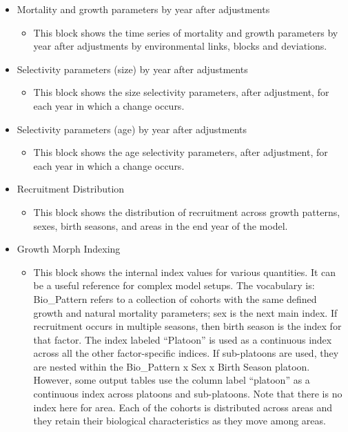 \begin{itemize}
	\item Mortality and growth parameters by year after adjustments
	\begin{itemize}
		\item This block shows the time series of mortality and growth parameters by year after adjustments by environmental links, blocks and deviations.
	\end{itemize}
	\item Selectivity parameters (size) by year after adjustments
	\begin{itemize}
		\item This block shows the size selectivity parameters, after adjustment, for each year in which a change occurs.
	\end{itemize}
	\item Selectivity parameters (age) by year after adjustments
	\begin{itemize}
		\item This block shows the age selectivity parameters, after adjustment, for each year in which a change occurs.
	\end{itemize}
	\item Recruitment Distribution
	\begin{itemize}
		\item This block shows the distribution of recruitment across growth patterns, sexes, birth seasons, and areas in the end year of the model.
	\end{itemize}
	\item Growth Morph Indexing
	\begin{itemize}
		\item This block shows the internal index values for various quantities. It can be a useful reference for complex model setups. The vocabulary is: Bio\_Pattern refers to a collection of cohorts with the same defined growth and natural mortality parameters; sex is the next main index. If recruitment occurs in multiple seasons, then birth season is the index for that factor. The index labeled ``Platoon'' is used as a continuous index across all the other factor-specific indices. If sub-platoons are used, they are nested within the Bio\_Pattern x Sex x Birth Season platoon. However, some output tables use the column label ``platoon'' as a continuous index across platoons and sub-platoons. Note that there is no index here for area. Each of the cohorts is distributed across areas and they retain their biological characteristics as they move among areas.
	\end{itemize}

\end{itemize}
